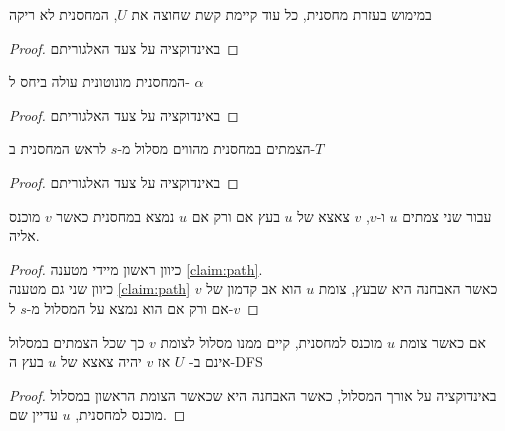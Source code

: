 \begin{claim}
במימוש בעזרת מחסנית, כל עוד קיימת קשת שחוצה את $U$, המחסנית לא ריקה
\end{claim}
\begin{proof}
באינדוקציה על צעד האלגוריתם
\end{proof}
\begin{claim}
המחסנית מונוטונית עולה ביחס ל-%
$\alpha$
\end{claim}
\begin{proof}
באינדוקציה על צעד האלגוריתם
\end{proof}
\begin{claim}
\label{claim:path}
הצמתים במחסנית מהווים מסלול מ-$s$ לראש המחסנית ב-$T$
\end{claim}
\begin{proof}
באינדוקציה על צעד האלגוריתם
\end{proof}
\begin{corollary}
עבור שני צמתים $u$ ו-$v$, $v$ צאצא של $u$ בעץ אם ורק אם $u$ נמצא במחסנית כאשר $v$ מוכנס 
אליה.
\end{corollary}
\begin{proof}
כיוון ראשון מיידי מטענה
\ref{claim:path}.
\\
כיוון שני גם מטענה 
\ref{claim:path}
כאשר האבחנה היא שבעץ, צומת $u$ הוא אב קדמון של $v$ אם ורק אם הוא נמצא על המסלול מ-$s$
ל-$v$
\end{proof}
\begin{lemma}
אם כאשר צומת $u$ מוכנס למחסנית, קיים ממנו מסלול לצומת $v$ כך שכל הצמתים במסלול אינם ב-%
$U$
אז $v$ יהיה צאצא של $u$ בעץ ה-DFS
\end{lemma}
\begin{proof}
באינדוקציה על אורך המסלול, 
כאשר האבחנה היא שכאשר הצומת הראשון במסלול מוכנס למחסנית, $u$ עדיין שם.
\end{proof}
